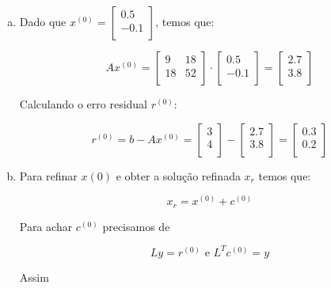\documentclass[11pt]{article}
\begin{document}
\newpage

\begin{exerc}
\begin{enumerate}[a.]
\
\item

Dado que $x^{(0)} =
\begin{bmatrix}
	0.5\\
	-0.1\\
\end{bmatrix}$, temos que:

$$Ax^{(0)} =
\begin{bmatrix}
	9 & 18\\
	18 & 52\\
\end{bmatrix}
\cdot
\begin{bmatrix}
	0.5\\
	-0.1\\
\end{bmatrix}
=
\begin{bmatrix}
	2.7\\
	3.8\\
\end{bmatrix}
$$

Calculando o erro residual $r^{(0)}$:

$$r^{(0)} = b - Ax^{(0)} =
\begin{bmatrix}
	3\\
	4\\
\end{bmatrix}
-
\begin{bmatrix}
	2.7\\
	3.8\\
\end{bmatrix}
=
\begin{bmatrix}
	0.3\\
	0.2\\
\end{bmatrix}
$$

\item
Para refinar $x{(0)}$ e obter a solução refinada $x_r$ temos que:

$$x_r = x^{(0)} + c^{(0)}$$

Para achar $c^{(0)}$ precisamos de

$$Ly = r^{(0)} \text{ e } L^Tc^{(0)} = y$$

Assim


\end{enumerate}
\end{exerc}
\end{document}
